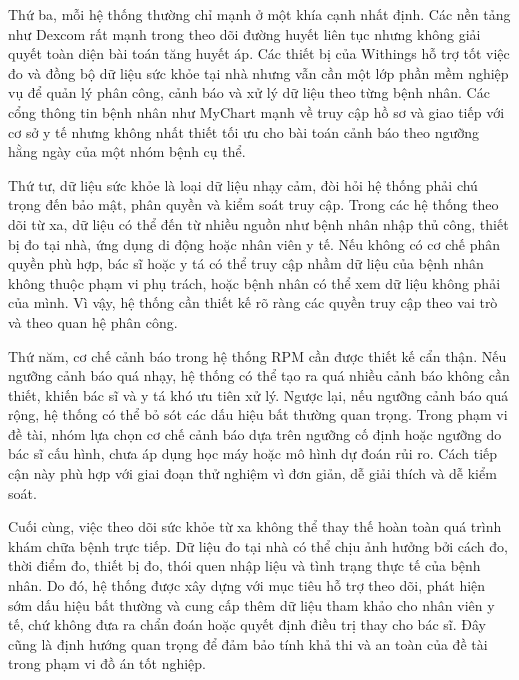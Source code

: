 \par Thứ ba, mỗi hệ thống thường chỉ mạnh ở một khía cạnh nhất định. Các nền tảng như Dexcom rất mạnh trong theo dõi đường huyết liên tục nhưng không giải quyết toàn diện bài toán tăng huyết áp. Các thiết bị của Withings hỗ trợ tốt việc đo và đồng bộ dữ liệu sức khỏe tại nhà nhưng vẫn cần một lớp phần mềm nghiệp vụ để quản lý phân công, cảnh báo và xử lý dữ liệu theo từng bệnh nhân. Các cổng thông tin bệnh nhân như MyChart mạnh về truy cập hồ sơ và giao tiếp với cơ sở y tế nhưng không nhất thiết tối ưu cho bài toán cảnh báo theo ngưỡng hằng ngày của một nhóm bệnh cụ thể.

\par Thứ tư, dữ liệu sức khỏe là loại dữ liệu nhạy cảm, đòi hỏi hệ thống phải chú trọng đến bảo mật, phân quyền và kiểm soát truy cập. Trong các hệ thống theo dõi từ xa, dữ liệu có thể đến từ nhiều nguồn như bệnh nhân nhập thủ công, thiết bị đo tại nhà, ứng dụng di động hoặc nhân viên y tế. Nếu không có cơ chế phân quyền phù hợp, bác sĩ hoặc y tá có thể truy cập nhầm dữ liệu của bệnh nhân không thuộc phạm vi phụ trách, hoặc bệnh nhân có thể xem dữ liệu không phải của mình. Vì vậy, hệ thống cần thiết kế rõ ràng các quyền truy cập theo vai trò và theo quan hệ phân công.

\par Thứ năm, cơ chế cảnh báo trong hệ thống RPM cần được thiết kế cẩn thận. Nếu ngưỡng cảnh báo quá nhạy, hệ thống có thể tạo ra quá nhiều cảnh báo không cần thiết, khiến bác sĩ và y tá khó ưu tiên xử lý. Ngược lại, nếu ngưỡng cảnh báo quá rộng, hệ thống có thể bỏ sót các dấu hiệu bất thường quan trọng. Trong phạm vi đề tài, nhóm lựa chọn cơ chế cảnh báo dựa trên ngưỡng cố định hoặc ngưỡng do bác sĩ cấu hình, chưa áp dụng học máy hoặc mô hình dự đoán rủi ro. Cách tiếp cận này phù hợp với giai đoạn thử nghiệm vì đơn giản, dễ giải thích và dễ kiểm soát.

\par Cuối cùng, việc theo dõi sức khỏe từ xa không thể thay thế hoàn toàn quá trình khám chữa bệnh trực tiếp. Dữ liệu đo tại nhà có thể chịu ảnh hưởng bởi cách đo, thời điểm đo, thiết bị đo, thói quen nhập liệu và tình trạng thực tế của bệnh nhân. Do đó, hệ thống được xây dựng với mục tiêu hỗ trợ theo dõi, phát hiện sớm dấu hiệu bất thường và cung cấp thêm dữ liệu tham khảo cho nhân viên y tế, chứ không đưa ra chẩn đoán hoặc quyết định điều trị thay cho bác sĩ. Đây cũng là định hướng quan trọng để đảm bảo tính khả thi và an toàn của đề tài trong phạm vi đồ án tốt nghiệp.